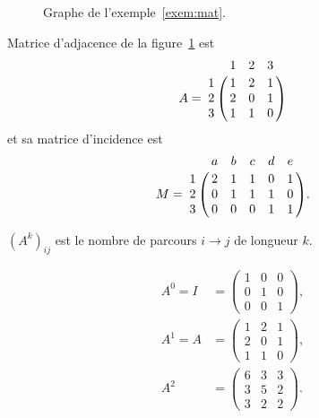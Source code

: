 \begin{myexem}
  \label{exem:mat}
  \begin{figure}[!h]
    \centering
    \caption{Graphe de l'exemple~\ref{exem:mat}.}
    \label{fig:matexem}
  \end{figure}

  Matrice d'adjacence de la figure~\ref{fig:matexem} est
  \[ A = \bordermatrix{~ & 1 & 2 & 3 \cr
                       1 & 1 & 2 & 1 \cr
                       2 & 2 & 0 & 1 \cr
                       3 & 1 & 1 & 0 \cr}
  \]
  et sa matrice d'incidence est
  \[
    M = \bordermatrix{~ & a & b & c & d & e\cr
                      1 & 2 & 1 & 1 & 0 & 1\cr
                      2 & 0 & 1 & 1 & 1 & 0\cr
                      3 & 0 & 0 & 0 & 1 & 1\cr}.
  \]

  $(A^k)_{ij}$ est le nombre de parcours $i \to j$ de longueur $k$.
  
  \begin{align*}
    A^0 = I & =
    \begin{pmatrix} 1 & 0 & 0\\
      0 & 1 & 0\\
      0 & 0 & 1
    \end{pmatrix},\\
    A^1 = A & =
    \begin{pmatrix} 1 & 2 & 1\\
      2 & 0 & 1\\
      1 & 1 & 0
    \end{pmatrix},\\
    A^2 & =
    \begin{pmatrix}  6 & 3 & 3\\
      3 & 5 & 2\\
      3 & 2 & 2
    \end{pmatrix}.
  \end{align*}
\end{myexem}

